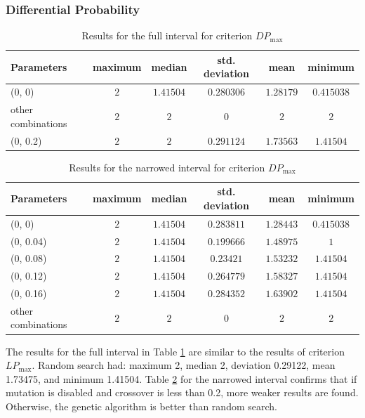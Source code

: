 \subsubsection{Differential Probability}
\begin{table}[tb]
\begin{center}
\begin{tabular}{| l | c | c | c | c | c |}
\hline
Parameters & maximum & median & std. deviation & mean & minimum \\ \hline
(0, 0) & $2$ & $1.41504$ & $0.280306$ & $1.28179$ & $0.415038$ \\ \hline
other combinations & $2$ & $2$ & $0$ & $2$ & $2$ \\ \hline
(0, 0.2) & $2$ & $2$ & $0.291124$ & $1.73563$ & $1.41504$ \\ \hline
\end{tabular}
\caption{Results for the full interval for criterion $DP_{\max}$}
\label{tabDP_MAXParameters}
\end{center}
\end{table}
\begin{table}[tb]
\begin{center}
\begin{tabular}{| l | c | c | c | c | c |}
\hline
Parameters & maximum & median & std. deviation & mean & minimum \\ \hline
(0, 0) & $2$ & $1.41504$ & $0.283811$ & $1.28443$ & $0.415038$ \\ \hline
(0, 0.04) & $2$ & $1.41504$ & $0.199666$ & $1.48975$ & $1$ \\ \hline
(0, 0.08) & $2$ & $1.41504$ & $0.23421$ & $1.53232$ & $1.41504$ \\ \hline
(0, 0.12) & $2$ & $1.41504$ & $0.264779$ & $1.58327$ & $1.41504$ \\ \hline
(0, 0.16) & $2$ & $1.41504$ & $0.284352$ & $1.63902$ & $1.41504$ \\ \hline
other combinations & $2$ & $2$ & $0$ & $2$ & $2$ \\ \hline
\end{tabular}
\caption{Results for the narrowed interval for criterion $DP_{\max}$} %
\label{tabDP_MAXParametersSmall}
\end{center}
\end{table}
The results for the full interval in Table \ref{tabDP_MAXParameters} are similar to the results of criterion $LP_{\max}$.
Random search had: maximum 2, median 2, deviation 0.29122, mean 1.73475, and minimum 1.41504.
Table \ref{tabDP_MAXParametersSmall} for the narrowed interval confirms that if mutation is disabled
and crossover is less than 0.2, more weaker results are found. Otherwise, the genetic algorithm is better than random search.

